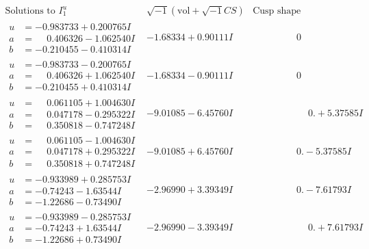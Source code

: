 \documentclass[1p]{elsarticle_modified}
\theoremstyle{definition}
\newcommand{\I}{\sqrt{-1}}
\begin{document}
$$\begin{array}{c|c|c}  
\text{Solutions to }I^u_{1}& \I (\text{vol} + \sqrt{-1}CS) & \text{Cusp shape}\\
 \hline 
\begin{aligned}
u &= -0.983733 + 0.200765 I \\
a &= \phantom{-}0.406326 - 1.062540 I \\
b &= -0.210455 - 0.410314 I\end{aligned}
 & -1.68334 + 0.90111 I & \phantom{-0.000000 } 0 \\ \hline\begin{aligned}
u &= -0.983733 - 0.200765 I \\
a &= \phantom{-}0.406326 + 1.062540 I \\
b &= -0.210455 + 0.410314 I\end{aligned}
 & -1.68334 - 0.90111 I & \phantom{-0.000000 } 0 \\ \hline\begin{aligned}
u &= \phantom{-}0.061105 + 1.004630 I \\
a &= \phantom{-}0.047178 - 0.295322 I \\
b &= \phantom{-}0.350818 - 0.747248 I\end{aligned}
 & -9.01085 - 6.45760 I & \phantom{-0.000000 -}0. + 5.37585 I \\ \hline\begin{aligned}
u &= \phantom{-}0.061105 - 1.004630 I \\
a &= \phantom{-}0.047178 + 0.295322 I \\
b &= \phantom{-}0.350818 + 0.747248 I\end{aligned}
 & -9.01085 + 6.45760 I & \phantom{-0.000000 } 0. - 5.37585 I \\ \hline\begin{aligned}
u &= -0.933989 + 0.285753 I \\
a &= -0.74243 - 1.63544 I \\
b &= -1.22686 - 0.73490 I\end{aligned}
 & -2.96990 + 3.39349 I & \phantom{-0.000000 } 0. - 7.61793 I \\ \hline\begin{aligned}
u &= -0.933989 - 0.285753 I \\
a &= -0.74243 + 1.63544 I \\
b &= -1.22686 + 0.73490 I\end{aligned}
 & -2.96990 - 3.39349 I & \phantom{-0.000000 -}0. + 7.61793 I \\ \hline\begin{aligned}

\end{aligned}
\end{array}$$
\end{document}
